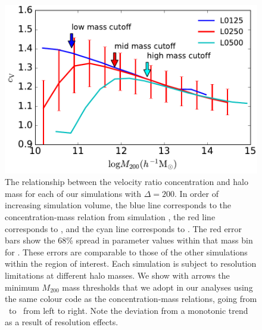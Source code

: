 \documentclass[usenatbib,fleqn]{mnras}
\begin{document}
\begin{figure}
\centering
\includegraphics[width=\columnwidth]{masscut_cV_d200.pdf}
\caption{The relationship between the velocity ratio concentration and halo mass for each of our simulations with $\Delta =200$. 
In order of increasing simulation volume, the blue line corresponds to the concentration-mass relation from simulation 
\simA, the red line corresponds to \simB, and the cyan line corresponds to \simC. The red error bars show the 68\% spread in
parameter values within that mass bin for \simB. These errors are comparable to those of the other simulations
within the region of interest.
Each simulation is subject to resolution limitations at different halo masses. We show with arrows
the minimum $M_{200}$ mass thresholds that we adopt in our analyses using the same colour code as 
the concentration-mass relations, going from \simA \ to \simC \ from left to right. Note the deviation from a monotonic trend as a result of resolution effects.
}
\label{fig:cvrelation}
\end{figure}
\end{document}
